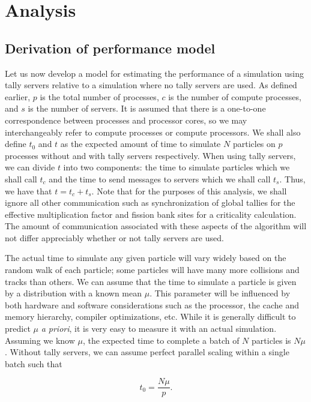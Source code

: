 \documentclass[3p]{elsarticle}
\begin{document}
\section{Analysis}
\label{sec:analysis}

\subsection{Derivation of performance model}

Let us now develop a model for estimating the performance of a simulation using
tally servers relative to a simulation where no tally servers are used. As
defined earlier, $p$ is the total number of processes, $c$ is the number of
compute processes, and $s$ is the number of servers. It is assumed that there is
a one-to-one correspondence between processes and processor cores, so we may
interchangeably refer to compute processes or compute processors. We shall also
define $t_0$ and $t$ as the expected amount of time to simulate $N$ particles on
$p$ processes without and with tally servers respectively. When using tally
servers, we can divide $t$ into two components: the time to simulate particles
which we shall call $t_c$ and the time to send messages to servers which we
shall call $t_s$. Thus, we have that $t = t_c + t_s$. Note that for the purposes
of this analysis, we shall ignore all other communication such as
synchronization of global tallies for the effective multiplication factor and
fission bank sites for a criticality calculation. The amount of communication
associated with these aspects of the algorithm will not differ appreciably
whether or not tally servers are used.

The actual time to simulate any given particle will vary widely based on the
random walk of each particle; some particles will have many more collisions and
tracks than others. We can assume that the time to simulate a particle is given
by a distribution with a known mean $\mu$. This parameter will be influenced by
both hardware and software considerations such as the processor, the cache and
memory hierarchy, compiler optimizations, etc. While it is generally difficult
to predict $\mu$ {\em a priori}, it is very easy to measure it with an actual
simulation. Assuming we know $\mu$, the expected time to complete a batch of $N$
particles is $N\mu$. Without tally servers, we can assume perfect parallel
scaling within a single batch such that

\begin{equation}
  \label{eq:time-without}
  t_0 = \frac{N\mu}{p}.
\end{equation}
\end{document}
